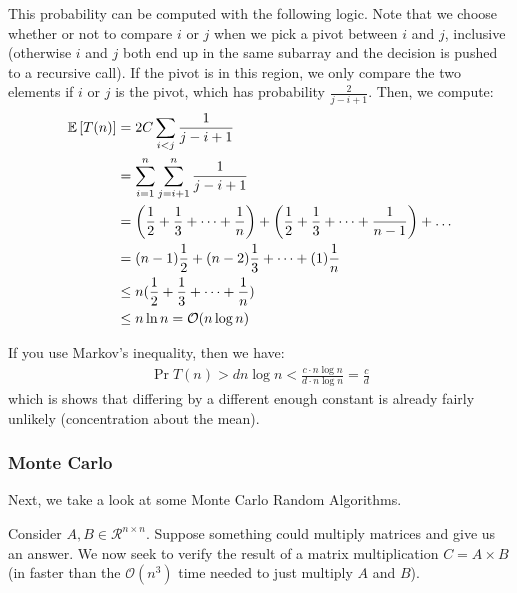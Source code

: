 \begin{algothm}[QuickSort]
    This probability can be computed with the following logic. Note that we choose whether or not to compare $i$ or $j$ when we pick a pivot between $i$ and $j$, inclusive (otherwise $i$ and $j$ both end up in the same subarray and the decision is pushed to a recursive call).
    If the pivot is in this region, we only compare the two elements if $i$ or $j$ is the pivot, which has probability $\frac{2}{j - i + 1}$. Then, we compute:
    \begin{align}
        \mathbb{E}\left[ T(n) \right] &= 2C \sum_{i < j} \frac{1}{j - i + 1} \\
        &= \sum_{i = 1}^n \sum_{j = i + 1}^n \frac{1}{j - i + 1} \\
        &= \qty(\frac12 + \frac13 + \dots + \frac{1}{n}) + \qty(\frac12 + \frac13 + \dots + \frac{1}{n - 1}) + \dots \\
        &= (n - 1) \frac12 + (n - 2) \frac13 + \dots + (1) \frac{1}{n} \\
        &\leq n (\frac12 + \frac13 + \dots + \frac{1}{n}) \\
        &\leq n \ln n = \mathcal{O}(n \log n)
    \end{align}

    If you use Markov's inequality, then we have:
    \begin{align*}
        \Pr{T(n) > d n \log n} < \frac{c \cdot n \log n}{d \cdot n \log n} = \frac{c}{d}
    \end{align*}
    which is shows that differing by a different enough constant is already fairly unlikely (concentration about the mean).
\end{algothm}

\subsubsection{Monte Carlo}
Next, we take a look at some Monte Carlo Random Algorithms.

Consider $A, B \in \mathcal{R}^{n \times n}$. Suppose something could multiply matrices and give us an answer.
We now seek to verify the result of a matrix multiplication $C = A \times B$ (in faster than the $\mathcal{O}(n^3)$ time needed to just multiply $A$ and $B$).

